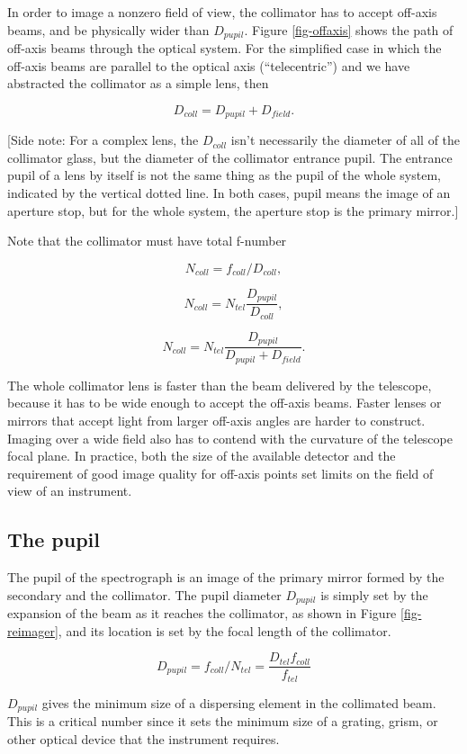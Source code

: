 \documentclass[12pt]{article}
\begin{document}
In order to image a nonzero field of view, the collimator
has to accept off-axis beams, and be physically wider than
$D_{pupil}$.  Figure \ref{fig-offaxis} shows the path of off-axis
beams through the optical system.
For the simplified case in which 
the off-axis beams are parallel to the optical
axis (``telecentric'') and we have abstracted the collimator
as a simple lens, then

$$ D_{coll} = D_{pupil} + D_{field}. $$

[Side note: For a complex lens, the $D_{coll}$ isn't necessarily the diameter 
of all of the collimator glass, but the diameter of the 
collimator entrance pupil.  The entrance pupil of a lens by itself
is not the same thing as the pupil of the whole system,
indicated by the vertical dotted line.  In both cases, pupil means
the image of an aperture stop, but for the whole system, the aperture
stop is the primary mirror.]

Note that the collimator must have total f-number

$$ N_{coll} = f_{coll} / D_{coll}, $$

$$ N_{coll} = N_{tel} \frac{D_{pupil}}{D_{coll}}, $$

$$ N_{coll} = N_{tel} \frac{D_{pupil}}{D_{pupil}+D_{field}}. $$

The whole collimator lens is faster than the beam delivered 
by the telescope, because it has to be wide enough to accept 
the off-axis beams.  Faster lenses or mirrors
that accept light from larger off-axis angles are harder to
construct.  Imaging over a wide field also has to contend with the
curvature of the telescope focal plane.  In practice, both the
size of the available detector and the requirement of good image 
quality for off-axis points set limits on the field of view of an 
instrument.

\subsection{The pupil}

The pupil of the spectrograph is an image of the primary
mirror formed by the secondary and the collimator.
The pupil diameter $D_{pupil}$ is simply set by the expansion
of the beam as it reaches the collimator, as shown in 
Figure \ref{fig-reimager}, and its location is set by 
the focal length of the collimator.

$$ D_{pupil} = f_{coll} / N_{tel} = \frac{D_{tel} f_{coll}}{f_{tel}} $$

$D_{pupil}$ gives the minimum size of a dispersing element in the
collimated beam.  This is a critical number since it sets the
minimum size of a grating, grism, or other optical device that the
instrument requires.
\end{document}
